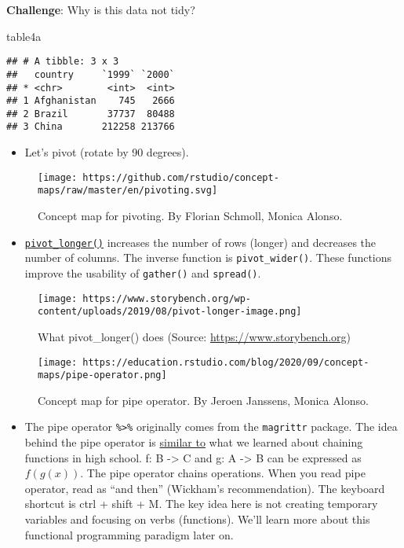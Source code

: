 \documentclass[
]{book}
\newenvironment{Shaded}{\begin{snugshade}}{\end{snugshade}}
\newcommand{\NormalTok}[1]{#1}
\providecommand{\tightlist}{%
  \setlength{\itemsep}{0pt}\setlength{\parskip}{0pt}}
\begin{document}
\textbf{Challenge}: Why is this data not tidy?

\begin{Shaded}
\begin{Highlighting}[]
\NormalTok{table4a}
\end{Highlighting}
\end{Shaded}

\begin{verbatim}
## # A tibble: 3 x 3
##   country     `1999` `2000`
## * <chr>        <int>  <int>
## 1 Afghanistan    745   2666
## 2 Brazil       37737  80488
## 3 China       212258 213766
\end{verbatim}

\begin{itemize}
\tightlist
\item
  Let's pivot (rotate by 90 degrees).
\end{itemize}

\begin{figure}
\centering
\texttt{[image: https://github.com/rstudio/concept-maps/raw/master/en/pivoting.svg]}
\caption{Concept map for pivoting. By Florian Schmoll, Monica Alonso.}
\end{figure}

\begin{itemize}
\tightlist
\item
  \href{https://tidyr.tidyverse.org/reference/pivot_longer.html}{\texttt{pivot\_longer()}} increases the number of rows (longer) and decreases the number of columns. The inverse function is \texttt{pivot\_wider()}. These functions improve the usability of \texttt{gather()} and \texttt{spread()}.
\end{itemize}

\begin{figure}
\centering
\texttt{[image: https://www.storybench.org/wp-content/uploads/2019/08/pivot-longer-image.png]}
\caption{What pivot\_longer() does (Source: \url{https://www.storybench.org})}
\end{figure}

\begin{figure}
\centering
\texttt{[image: https://education.rstudio.com/blog/2020/09/concept-maps/pipe-operator.png]}
\caption{Concept map for pipe operator. By Jeroen Janssens, Monica Alonso.}
\end{figure}

\begin{itemize}
\tightlist
\item
  The pipe operator \texttt{\%\textgreater{}\%} originally comes from the \texttt{magrittr} package. The idea behind the pipe operator is \href{https://www.datacamp.com/community/tutorials/pipe-r-tutorial}{similar to} what we learned about chaining functions in high school. f: B -\textgreater{} C and g: A -\textgreater{} B can be expressed as \(f(g(x))\). The pipe operator chains operations. When you read pipe operator, read as ``and then'' (Wickham's recommendation). The keyboard shortcut is ctrl + shift + M. The key idea here is not creating temporary variables and focusing on verbs (functions). We'll learn more about this functional programming paradigm later on.
\end{itemize}
\end{document}
